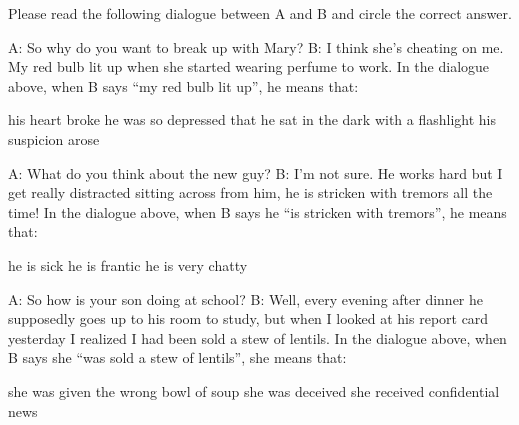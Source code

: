 \documentclass[output=paper]{langsci/langscibook}
\begin{document}
\begin{paperappendix}
{\noindent Please read the following dialogue between A and B and circle the correct answer.
\begin{exe}
    \begin{xlist}
    \sn A: So why do you want to break up with Mary?
    \sn B: I think she's cheating on me. My red bulb lit up when she started wearing perfume to work.
    \sn In the dialogue above, when B says \enquote{my red bulb lit up}, he means that:
    \begin{xlist}
         his heart broke
         he was so depressed that he sat in the dark with a flashlight
         his suspicion arose
    \end{xlist}
    \end{xlist}
    \begin{xlist}
        \sn A: What do you think about the new guy?
        \sn B: I'm not sure. He works hard but I get really distracted sitting across from him, he is stricken with tremors all the time!
        \sn In the dialogue above, when B says he \enquote{is stricken with tremors}, he means that:
        \begin{xlist}
         he is sick
         he is frantic
         he is very chatty
        \end{xlist}
        \end{xlist}
        \begin{xlist}
        \sn A: So how is your son doing at school?
        \sn B: Well, every evening after dinner he supposedly goes up to his room to study, but when I looked at his report card yesterday I realized I had been sold a stew of lentils.
        \sn In the dialogue above, when B says she \enquote{was sold a stew of lentils}, she means that:
        \begin{xlist}
         she was given the wrong bowl of soup
         she was deceived
         she received confidential news
        \end{xlist}
        \end{xlist}

\end{exe}}
\end{paperappendix}
\end{document}
